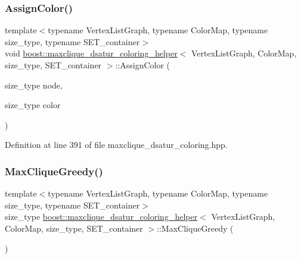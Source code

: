 \subsubsection{\texorpdfstring{Assign\+Color()}{AssignColor()}}
{\footnotesize\ttfamily template$<$typename Vertex\+List\+Graph, typename Color\+Map, typename size\+\_\+type, typename S\+E\+T\+\_\+container$>$ \\
void \hyperlink{classboost_1_1maxclique__dsatur__coloring__helper}{boost\+::maxclique\+\_\+dsatur\+\_\+coloring\+\_\+helper}$<$ Vertex\+List\+Graph, Color\+Map, size\+\_\+type, S\+E\+T\+\_\+container $>$\+::Assign\+Color (\begin{DoxyParamCaption}\item[{size\+\_\+type}]{node,  }\item[{size\+\_\+type}]{color }\end{DoxyParamCaption})\hspace{0.3cm}{\ttfamily [inline]}}



Definition at line 391 of file maxclique\+\_\+dsatur\+\_\+coloring.\+hpp.

\mbox{\label{classboost_1_1maxclique__dsatur__coloring__helper_a0d161cb723d96561a6fd30413a84af53}} 
\subsubsection{\texorpdfstring{Max\+Clique\+Greedy()}{MaxCliqueGreedy()}}
{\footnotesize\ttfamily template$<$typename Vertex\+List\+Graph, typename Color\+Map, typename size\+\_\+type, typename S\+E\+T\+\_\+container$>$ \\
size\+\_\+type \hyperlink{classboost_1_1maxclique__dsatur__coloring__helper}{boost\+::maxclique\+\_\+dsatur\+\_\+coloring\+\_\+helper}$<$ Vertex\+List\+Graph, Color\+Map, size\+\_\+type, S\+E\+T\+\_\+container $>$\+::Max\+Clique\+Greedy (\begin{DoxyParamCaption}{ }\end{DoxyParamCaption})\hspace{0.3cm}{\ttfamily [inline]}}



